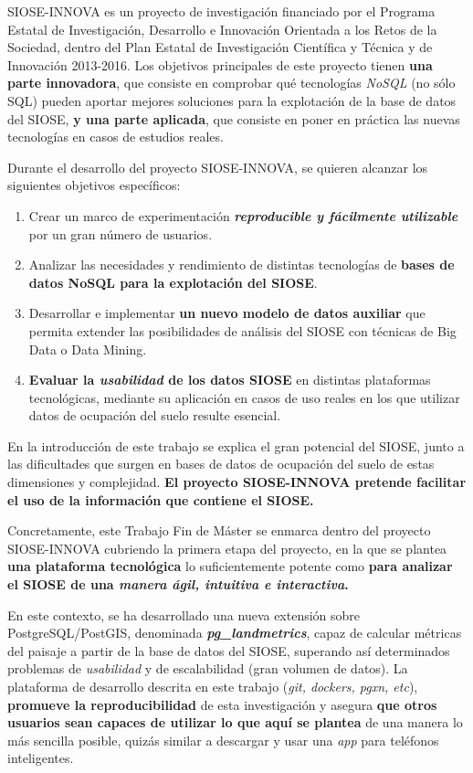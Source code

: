 \begin{prologo}
SIOSE-INNOVA es un proyecto de investigación financiado por el Programa Estatal de Investigación, Desarrollo e Innovación Orientada a los Retos de la Sociedad, dentro del Plan Estatal de Investigación Científica y Técnica y de Innovación 2013-2016. Los objetivos principales  de este proyecto tienen \textbf{una parte innovadora}, que consiste en comprobar qué tecnologías \textit{NoSQL} (no sólo SQL) pueden aportar mejores soluciones para la explotación de la base de datos del SIOSE, \textbf{y una parte aplicada}, que consiste en poner en práctica las nuevas tecnologías en casos de estudios reales.

Durante el desarrollo del proyecto SIOSE-INNOVA, se quieren alcanzar los siguientes objetivos específicos:
\begin{enumerate}
\item Crear un marco de experimentación \textbf{\textit{reproducible y fácilmente utilizable}} por un gran número de usuarios.
\item Analizar las necesidades y rendimiento de distintas tecnologías de \textbf{bases de datos NoSQL para la explotación del SIOSE}.
\item Desarrollar e implementar \textbf{un nuevo modelo de datos auxiliar} que permita extender las posibilidades de análisis del SIOSE con técnicas de Big Data o Data Mining.
\item \textbf{Evaluar la \textit{usabilidad} de los datos SIOSE} en distintas plataformas tecnológicas, mediante su aplicación en casos de uso reales en los que utilizar datos de ocupación del suelo resulte esencial.
\end{enumerate}

En la introducción de este trabajo se explica el gran potencial del SIOSE, junto a las dificultades que surgen en bases de datos de ocupación del suelo de estas dimensiones y complejidad. \textbf{El proyecto SIOSE-INNOVA pretende facilitar el uso de la información que contiene el SIOSE.}

Concretamente, este Trabajo Fin de Máster se enmarca dentro del proyecto SIOSE-INNOVA cubriendo la primera etapa del proyecto, en la que se plantea \textbf{una plataforma tecnológica} lo suficientemente potente como \textbf{para analizar el SIOSE de una \textit{manera ágil, intuitiva e interactiva}.}

En este contexto, se ha desarrollado una nueva extensión sobre PostgreSQL/PostGIS, denominada \textbf{\textit{pg\_landmetrics}}, capaz de calcular métricas del paisaje a partir de la base de datos del SIOSE, superando así determinados problemas de \textit{usabilidad} y de escalabilidad (gran volumen de datos). La plataforma de desarrollo descrita en este trabajo (\textit{git, dockers, pgxn, etc}), \textbf{promueve la reproducibilidad} de esta investigación y asegura \textbf{que otros usuarios sean capaces de utilizar lo que aquí se plantea} de una manera lo más sencilla posible, quizás similar a descargar y usar una \textit{app} para teléfonos inteligentes.


\end{prologo}
